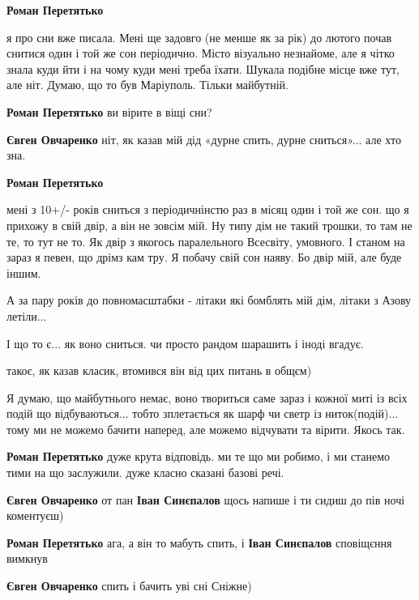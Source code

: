 \begin{itemize} %
\textbf{Роман Перетятько} 

я про сни вже писала. Мені ще задовго (не менше як за рік) до лютого почав
снитися один і той же сон періодично. Місто візуально незнайоме, але я чітко
знала куди йти і на чому куди мені треба їхати. Шукала подібне місце вже тут,
але ніт. Думаю, що то був Маріуполь. Тільки майбутній.

\textbf{Роман Перетятько} ви вірите в віщі сни?

\textbf{Євген Овчаренко} ніт, як казав мій дід «дурне спить, дурне сниться»... але хто зна.

\textbf{Роман Перетятько} 

мені з 10+/- років сниться з періодичнінстю раз в місяц один і той же сон. що я
прихожу в свій двір, а він не зовсім мій. Ну типу дім не такий трошки, то там
не те, то тут не то. Як двір з якогось паралельного Всесвіту, умовного. І
станом на зараз я певен, що дрімз кам тру. Я побачу свій сон наяву. Бо двір
мій, але буде іншим.

А за пару років до повномасштабки - літаки які бомблять мій дім, літаки з Азову
летіли...

І що то є... як воно сниться. чи просто рандом шарашить і іноді вгадує.

такоє, як казав класик, втомився він від цих питань в общєм)


Я думаю, що майбутнього немає, воно твориться саме зараз і кожної миті із всіх
подій що відбуваються... тобто зплетається як шарф чи светр із ниток(подій)... тому
ми не можемо бачити наперед, але можемо відчувати та вірити. Якось так.

\textbf{Роман Перетятько} дуже крута відповідь.
ми те що ми робимо, і ми станемо тими на що заслужили.
дуже класно сказані базові речі.

\textbf{Євген Овчаренко} от пан \textbf{Іван Синєпалов} щось напише і ти сидиш до пів ночі коментуєш)

\textbf{Роман Перетятько} ага, а він то мабуть спить, і \textbf{Іван Синєпалов} сповіщєння вимкнув

\textbf{Євген Овчаренко} спить і бачить уві сні Сніжне)



\end{itemize}
